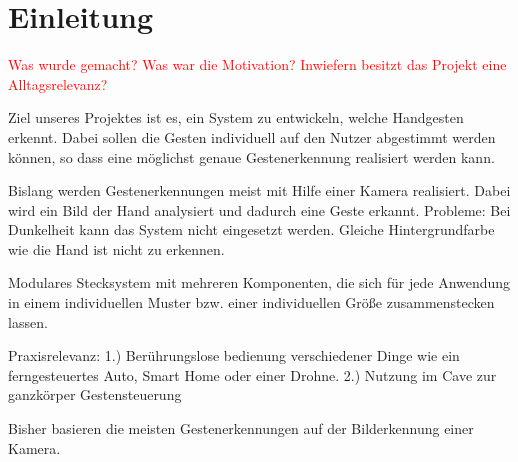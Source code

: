 \chapter{Einleitung}
\label{ch:Einleitung}

\textcolor{red}{Was wurde gemacht? Was war die Motivation? Inwiefern besitzt das Projekt eine Alltagsrelevanz?}

Ziel unseres Projektes ist es, ein System zu entwickeln, welche Handgesten erkennt. Dabei sollen die Gesten individuell auf den Nutzer abgestimmt werden können, so dass eine möglichst genaue Gestenerkennung realisiert werden kann.

Bislang werden Gestenerkennungen meist mit Hilfe einer Kamera realisiert. Dabei wird ein Bild der Hand analysiert und dadurch eine Geste erkannt. Probleme: Bei Dunkelheit kann das System nicht eingesetzt werden. Gleiche Hintergrundfarbe wie die Hand ist nicht zu erkennen. 

Modulares Stecksystem mit mehreren Komponenten, die sich für jede Anwendung in einem individuellen Muster bzw. einer individuellen Größe zusammenstecken lassen.

Praxisrelevanz: 
1.) Berührungslose bedienung verschiedener Dinge wie ein ferngesteuertes Auto, Smart Home oder einer Drohne. 
2.) Nutzung im Cave zur ganzkörper Gestensteuerung

Bisher basieren die meisten Gestenerkennungen auf der Bilderkennung einer Kamera.